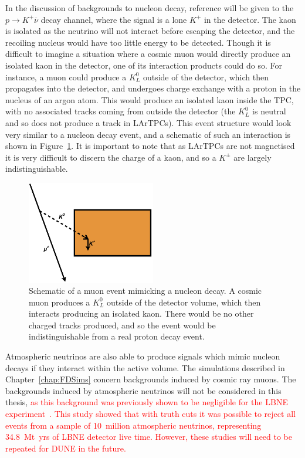 In the discussion of backgrounds to nucleon decay, reference will be given to the $p \rightarrow K^{+} \overline{\nu}$ decay channel, where the signal is a lone $K^{+}$ in the detector. The kaon is isolated as the neutrino will not interact before escaping the detector, and the recoiling nucleus would have too little energy to be detected. Though it is difficult to imagine a situation where a cosmic muon would directly produce an isolated kaon in the detector, one of its interaction products could do so. For instance, a muon could produce a $K^{0}_{L}$ outside of the detector, which then propagates into the detector, and undergoes charge exchange with a proton in the nucleus of an argon atom. This would produce an isolated kaon inside the TPC, with no associated tracks coming from outside the detector (the $K^{0}_{L}$ is neutral and so does not produce a track in LArTPCs). This event structure would look very similar to a nucleon decay event, and a schematic of such an interaction is shown in Figure~\ref{fig:K0LongBackground}. It is important to note that as LArTPCs are not magnetised it is very difficult to discern the charge of a kaon, and so a $K^{\pm}$ are largely indistinguishable. \\

\begin{figure}
  \centering
  \includegraphics[width=0.5\textwidth]{KaonNDKInteraction}
  \caption[Schematic of a muon event mimicking a nucleon decay]
          {Schematic of a muon event mimicking a nucleon decay. A cosmic muon produces a $K^{0}_{L}$ outside of the detector volume, which then interacts producing an isolated kaon. There would be no other charged tracks produced, and so the event would be indistinguishable from a real proton decay event.}
  \label{fig:K0LongBackground}
\end{figure}

Atmospheric neutrinos are also able to produce signals which mimic nucleon decays if they interact within the active volume. The simulations described in Chapter~\ref{chap:FDSims} concern backgrounds induced by cosmic ray muons. The backgrounds induced by atmospheric neutrinos will not be considered in this thesis, \textcolor{red}{as this background was previously shown to be negligible for the LBNE experiment~\citep{LBNE8836}. This study showed that with truth cuts it was possible to reject all events from a sample of 10~million atmospheric neutrinos, representing 34.8~Mt~yrs of LBNE detector live time. However, these studies will need to be repeated for DUNE in the future.} \\

